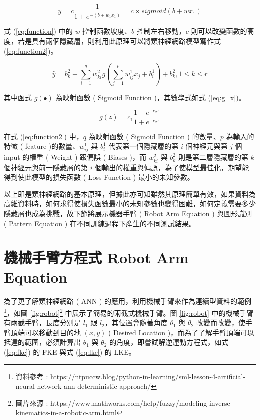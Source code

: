 \begin{equation}\label{eq:function}
y=c \frac{1}{1+e^{-(b+w_1 x_1)}}=c \times sigmoid(b+w x_1)
\end{equation}

式 (\ref{eq:function}) 中的 $w$ 控制函數坡度、$b$ 控制左右移動，$c$ 則可以改變函數的高度，若是具有兩個隱藏層，則利用此原理可以將類神經網路模型寫作式 (\ref{eq:function2})。

\begin{equation}\label{eq:function2}
\hat{y}=b_k^{2}+\sum_{i=1}^{q} w_{ki}^{2} g(\sum_{j=1}^{p} w_{ij}^{1} x_j +b_i^{1})+b_k^{2}, 1 \leq k \leq r 
\end{equation}

其中函式 $g(\bullet)$ 為映射函數 ( Sigmoid Function )，其數學式如式  (\ref{eq:g_x})。

\begin{equation}\label{eq:g_x}
g(z)=c_1 \frac{1-e^{-c_2 z}}{1+ e^{-c_2 z}}
\end{equation}

在式 (\ref{eq:function2}) 中，$q$ 為映射函數 ( Sigmoid Function ) 的數量、$p$ 為輸入的特徵 ( feature )的數量、$w_{ij}^{1}$ 與 $b_i^{1}$ 代表第一個隱藏層的第 $i$ 個神經元與第 $j$ 個 input 的權重 ( Weight ) 跟偏誤 ( Biases )，而 $w_{ki}^{2}$ 與 $b_k^{2}$ 則是第二層隱藏層的第 $k$ 個神經元與前一隱藏層的第 $i$ 個輸出的權重與偏誤，為了使模型最佳化，期望能得到使此模型的損失函數 ( Loss Function ) 最小的未知參數。

以上即是類神經網路的基本原理，但據此亦可知雖然其原理簡單有效，如果資料為高維資料時，如何求得使損失函數最小的未知參數也變得困難，如何定義需要多少隱藏層也成為挑戰，故下節將展示機器手臂 ( Robot Arm Equation ) 與圖形識別 ( Pattern Equation ) 在不同訓練過程下產生的不同測試結果。


\section{機械手臂方程式 Robot Arm Equation}

為了更了解類神經網路 ( ANN ) 的應用，利用機械手臂來作為連續型資料的範例\footnote{資料參考 : https://ntpuccw.blog/python-in-learning/sml-lesson-4-artificial-neural-network-ann-deterministic-approach/}，如圖 \ref{fig:robot}\footnote{圖片來源 : https://www.mathworks.com/help/fuzzy/modeling-inverse-kinematics-in-a-robotic-arm.html} 中展示了簡易的兩截式機械手臂。圖 \ref{fig:robot} 中的機械手臂有兩截手臂，長度分別是 $l_1$ 跟 $l_2$，其位置會隨著角度 $\theta_1$ 與 $\theta_2$ 改變而改變，使手臂頂端可以移動到目的地 $(x,y)$ ( Desired Location )，而為了了解手臂頂端可以抵達的範圍，必須計算出 $\theta_1$ 與 $\theta_2$ 的角度，即嘗試解逆運動方程式，如式 (\ref{eq:fke}) 的 FKE 與式 (\ref{eq:lke}) 的 LKE。

